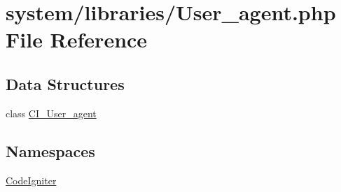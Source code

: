 \hypertarget{_user__agent_8php}{\section{system/libraries/\-User\-\_\-agent.php File Reference}
\label{_user__agent_8php}
}
\subsection*{Data Structures}
\begin{DoxyCompactItemize}
\item 
class \hyperlink{class_c_i___user__agent}{C\-I\-\_\-\-User\-\_\-agent}
\end{DoxyCompactItemize}
\subsection*{Namespaces}
\begin{DoxyCompactItemize}
\item 
\hyperlink{namespace_code_igniter}{Code\-Igniter}
\end{DoxyCompactItemize}
